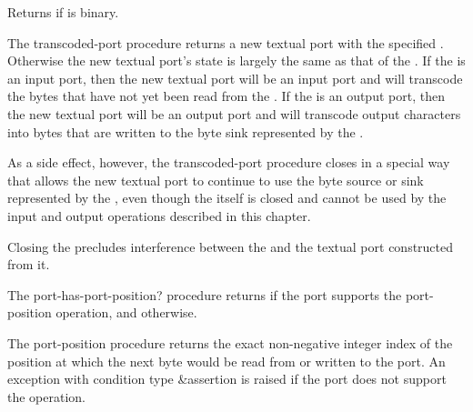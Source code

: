 \begin{entry}{%
}

Returns \schtrue{} if  is binary.
\end{entry}

\begin{entry}{%
}

The {\cf transcoded-port} procedure
returns a new textual port with the specified .
Otherwise the new textual port's state is largely the same as
that of the .
If the  is an input port, then the new textual
port will be an input port and
will transcode the bytes that have not yet been read from
the .
If the  is an output port, then the new textual
port will be an output port and
will transcode output characters into bytes that are
written to the byte sink represented by the .

As a side effect, however, the {\cf transcoded-port} procedure
closes  in
a special way that allows the new textual port to continue to
use the byte source or sink represented by the ,
even though the  itself is closed and cannot
be used by the input and output operations described in this
chapter.

\begin{rationale}
Closing the  precludes interference between
the  and the textual port constructed from it.
\end{rationale}
\end{entry}

\begin{entry}{%
}

The {\cf port-has-port-position?} procedure returns \schtrue{} if the
port supports the {\cf port-position} operation, and \schfalse{}
otherwise.

The {\cf port-position} procedure
returns the exact non-negative integer index of the position at which the
next byte would be read from or written to the port.
An exception with condition type {\cf\&assertion}
is raised if the port does not support the operation.
\end{entry}   

